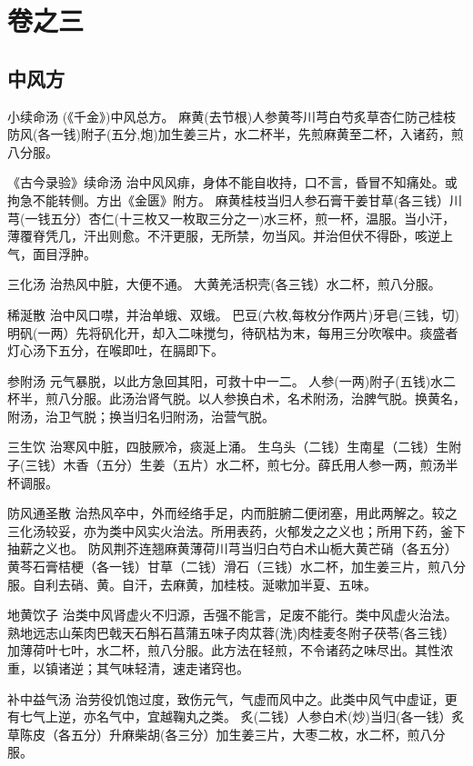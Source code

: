 \documentclass[a4paper,12pt,UTF8,twoside]{ctexbook}
\begin{document}
    
    
    \part{卷之三}
    \chapter{中风方}
    	
    
    小续命汤
    (《千金》)中风总方。
    麻黄(去节根)人参黄芩川芎白芍炙草杏仁防己桂枝防风(各一钱)附子(五分,炮)加生姜三片，水二杯半，先煎麻黄至二杯，入诸药，煎八分服。
    
    《古今录验》续命汤
    治中风风痱，身体不能自收持，口不言，昏冒不知痛处。或拘急不能转侧。方出《金匮》附方。
    麻黄桂枝当归人参石膏干姜甘草(各三钱）川芎(一钱五分）杏仁(十三枚又一枚取三分之一)水三杯，煎一杯，温服。当小汗，薄覆脊凭几，汗出则愈。不汗更服，无所禁，勿当风。并治但伏不得卧，咳逆上气，面目浮肿。
    
    三化汤
    治热风中脏，大便不通。
    大黄羌活枳壳(各三钱）水二杯，煎八分服。
    
    稀涎散
    治中风口噤，并治单蛾、双蛾。
    巴豆(六枚,每枚分作两片)牙皂(三钱，切)明矾(一两）先将矾化开，却入二味搅匀，待矾枯为末，每用三分吹喉中。痰盛者灯心汤下五分，在喉即吐，在膈即下。
    
    参附汤
    元气暴脱，以此方急回其阳，可救十中一二。
    人参(一两)附子(五钱)水二杯半，煎八分服。此汤治肾气脱。以人参换白术，名术附汤，治脾气脱。换黄名，附汤，治卫气脱；换当归名归附汤，治营气脱。
    
    三生饮
    治寒风中脏，四肢厥冷，痰涎上涌。
    生乌头（二钱）生南星（二钱）生附子(三钱）木香（五分）生姜（五片）水二杯，煎七分。薛氏用人参一两，煎汤半杯调服。
    
    防风通圣散
    治热风卒中，外而经络手足，内而脏腑二便闭塞，用此两解之。较之三化汤较妥，亦为类中风实火治法。所用表药，火郁发之之义也；所用下药，釜下抽薪之义也。
    防风荆芥连翘麻黄薄荷川芎当归白芍白术山栀大黄芒硝（各五分）黄芩石膏桔梗（各一钱）甘草（二钱）滑石（三钱）水二杯，加生姜三片，煎八分服。自利去硝、黄。自汗，去麻黄，加桂枝。涎嗽加半夏、五味。
    
    地黄饮子
    治类中风肾虚火不归源，舌强不能言，足废不能行。类中风虚火治法。
    熟地远志山茱肉巴戟天石斛石菖蒲五味子肉苁蓉(洗)肉桂麦冬附子茯苓(各三钱）加薄荷叶七叶，水二杯，煎八分服。此方法在轻煎，不令诸药之味尽出。其性浓重，以镇诸逆；其气味轻清，速走诸窍也。
    
    补中益气汤
    治劳役饥饱过度，致伤元气，气虚而风中之。此类中风气中虚证，更有七气上逆，亦名气中，宜越鞠丸之类。
    炙(二钱）人参白术(炒)当归(各一钱）炙草陈皮（各五分）升麻柴胡(各三分）加生姜三片，大枣二枚，水二杯，煎八分服。
    
\end{document}
